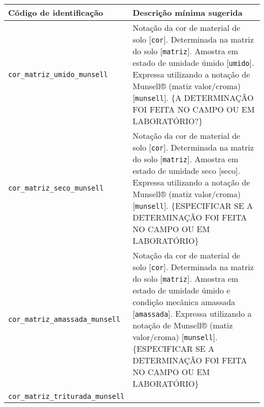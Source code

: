 \documentclass[
  a4paper,
  dvipsnames]{tufte-book}
\begin{document}
\begin{longtable}[]{@{}ll@{}}
\toprule
\begin{minipage}[b]{0.51\columnwidth}\raggedright
Código de identificação\strut
\end{minipage} & \begin{minipage}[b]{0.43\columnwidth}\raggedright
Descrição mínima sugerida\strut
\end{minipage}\tabularnewline
\midrule
\endhead
\begin{minipage}[t]{0.51\columnwidth}\raggedright
\texttt{cor\_matriz\_umido\_munsell}\strut
\end{minipage} & \begin{minipage}[t]{0.43\columnwidth}\raggedright
Notação da cor de material de solo {[}\texttt{cor}{]}. Determinada na matriz do solo {[}\texttt{matriz}{]}. Amostra em estado de umidade úmido {[}\texttt{umido}{]}. Expressa utilizando a notação de Munsell® (matiz valor/croma) {[}\texttt{munsell}{]}. \{A DETERMINAÇÃO FOI FEITA NO CAMPO OU EM LABORATÓRIO?\}\strut
\end{minipage}\tabularnewline
\begin{minipage}[t]{0.51\columnwidth}\raggedright
\texttt{cor\_matriz\_seco\_munsell}\strut
\end{minipage} & \begin{minipage}[t]{0.43\columnwidth}\raggedright
Notação da cor de material de solo {[}\texttt{cor}{]}. Determinada na matriz do solo {[}\texttt{matriz}{]}. Amostra em estado de umidade seco {[}seco{]}. Expressa utilizando a notação de Munsell® (matiz valor/croma) {[}\texttt{munsell}{]}. \{ESPECIFICAR SE A DETERMINAÇÃO FOI FEITA NO CAMPO OU EM LABORATÓRIO\}\strut
\end{minipage}\tabularnewline
\begin{minipage}[t]{0.51\columnwidth}\raggedright
\texttt{cor\_matriz\_amassada\_munsell}\strut
\end{minipage} & \begin{minipage}[t]{0.43\columnwidth}\raggedright
Notação da cor de material de solo {[}\texttt{cor}{]}. Determinada na matriz do solo {[}\texttt{matriz}{]}. Amostra em estado de umidade úmido e condição mecânica amassada {[}\texttt{amassada}{]}. Expressa utilizando a notação de Munsell® (matiz valor/croma) {[}\texttt{munsell}{]}. \{ESPECIFICAR SE A DETERMINAÇÃO FOI FEITA NO CAMPO OU EM LABORATÓRIO\}\strut
\end{minipage}\tabularnewline
\begin{minipage}[t]{0.51\columnwidth}\raggedright
\texttt{cor\_matriz\_triturada\_munsell}\strut

\end{minipage}
\end{longtable}
\end{document}
